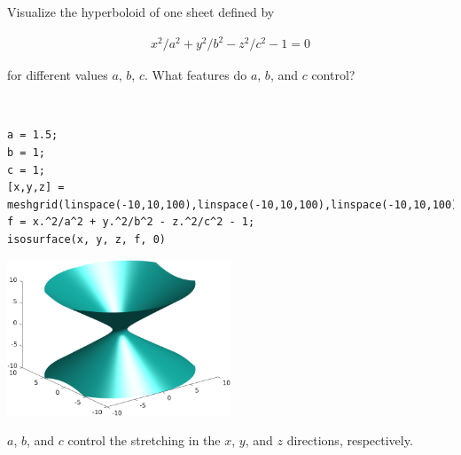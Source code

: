 Visualize the hyperboloid of one sheet defined by

\begin{align*}
    x^2/a^2 + y^2/b^2 - z^2/c^2 - 1 = 0
\end{align*}

for different values $a$, $b$, $c$. What features do $a$, $b$, and $c$ control?

\begin{solution}\
\begin{lstlisting}
a = 1.5;
b = 1;
c = 1;
[x,y,z] = meshgrid(linspace(-10,10,100),linspace(-10,10,100),linspace(-10,10,100));
f = x.^2/a^2 + y.^2/b^2 - z.^2/c^2 - 1;
isosurface(x, y, z, f, 0)
\end{lstlisting}

\begin{center}
    \includegraphics[width=0.5\textwidth]{img/e14p1.png}
\end{center}

$a$, $b$, and $c$ control the stretching in the $x$, $y$, and $z$ directions, respectively.
\end{solution}